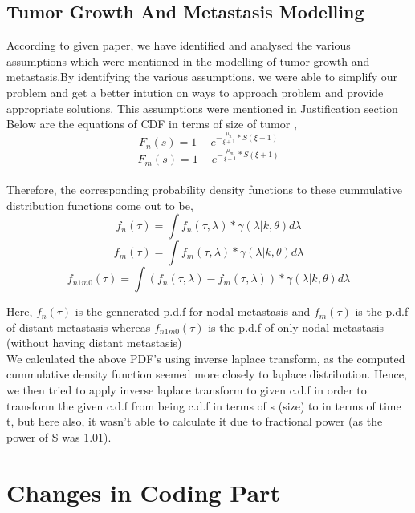 \documentclass{article}
\begin{document}
	
	
	\subsection{Tumor Growth And Metastasis Modelling}
	
	According to given paper, we have identified and analysed the various assumptions which were mentioned in the modelling of tumor growth and metastasis.By identifying the various assumptions, we were able to simplify our problem and get a better intution on ways to approach problem and provide appropriate solutions. This assumptions were mentioned in Justification section\\
	
	Below are the equations of CDF in terms of size of tumor ,
	$$F_n(s) = 1- e^{- \frac{\mu_n}{\xi +1} * S(\xi +1)}$$
	$$F_m(s) = 1- e^{- \frac{\mu_m}{\xi +1} * S(\xi +1)}$$\\
	Therefore, the corresponding probability density functions to these cummulative distribution functions come out to be, \\ 
	
	$$f_n(\tau) = \int f_n(\tau,\lambda)* \gamma(\lambda|k,\theta)d\lambda$$
	$$f_m(\tau) = \int f_m(\tau,\lambda)* \gamma(\lambda|k,\theta)d\lambda$$
	$$f_{n1m0}(\tau) = \int (f_n(\tau,\lambda) - f_m(\tau,\lambda)) * \gamma(\lambda|k,\theta)d\lambda$$
	
	Here, $f_n(\tau)$ is the gennerated p.d.f for nodal metastasis and  $f_m(\tau)$ is the p.d.f of distant metastasis whereas $f_{n1m0}(\tau)$ is the p.d.f of only nodal metastasis (without having distant metastasis)\\
	

	
	We calculated the above PDF's using inverse laplace transform, as the computed cummulative density function seemed more closely to laplace distribution. Hence, we then tried to apply inverse laplace transform to given c.d.f in order to transform the given c.d.f from being c.d.f in terms of s (size) to in terms of time t, but here also, it wasn't able to calculate it due to fractional power (as the power of S was 1.01).\\
	
	
	
	
	\section{Changes in Coding Part}
	
\end{document}
